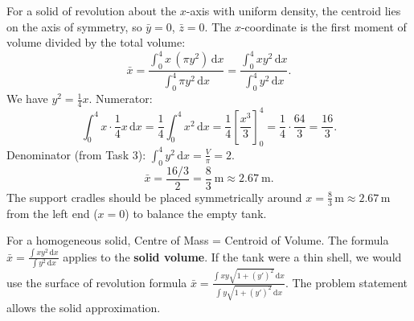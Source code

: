 \documentclass[11pt]{article}
\begin{document}
\begin{exoresolu}
For a solid of revolution about the $x$-axis with uniform density, the centroid lies on the axis of symmetry, so $\bar{y}=0$, $\bar{z}=0$. The $x$-coordinate is the first moment of volume divided by the total volume:
\[
\bar{x} = \frac{\int_0^4 x\,(\pi y^2)\,\mathrm{d}x}{\int_0^4 \pi y^2\,\mathrm{d}x} = \frac{\int_0^4 x y^2\,\mathrm{d}x}{\int_0^4 y^2\,\mathrm{d}x}.
\]
We have $y^2 = \frac{1}{4}x$. Numerator:
\[
\int_0^4 x \cdot \frac{1}{4}x\,\mathrm{d}x = \frac{1}{4} \int_0^4 x^2\,\mathrm{d}x = \frac{1}{4} \left[ \frac{x^3}{3} \right]_0^4 = \frac{1}{4} \cdot \frac{64}{3} = \frac{16}{3}.
\]
Denominator (from Task 3): $\int_0^4 y^2\,\mathrm{d}x = \frac{V}{\pi} = 2$.
\[
\bar{x} = \frac{16/3}{2} = \frac{8}{3}\ \mathrm{m} \approx 2.67\ \mathrm{m}.
\]
The support cradles should be placed symmetrically around $x = \frac{8}{3}\,\mathrm{m} \approx 2.67\,\mathrm{m}$ from the left end ($x=0$) to balance the empty tank.
\end{exoresolu}

\begin{attention}
For a homogeneous solid, Centre of Mass = Centroid of Volume. The formula $\bar{x} = \frac{\int x y^2\,\mathrm{d}x}{\int y^2\,\mathrm{d}x}$ applies to the \textbf{solid volume}. If the tank were a thin shell, we would use the surface of revolution formula $\bar{x} = \frac{\int x y \sqrt{1+(y')^2}\,\mathrm{d}x}{\int y \sqrt{1+(y')^2}\,\mathrm{d}x}$. The problem statement allows the solid approximation.
\end{attention}
\end{document}
